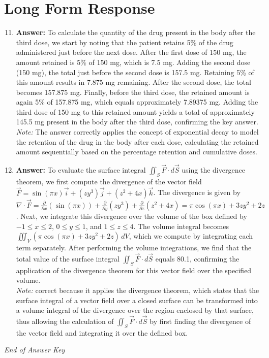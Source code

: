 \documentclass[12pt]{article}
\begin{document}
\section*{Long Form Response}
\begin{enumerate}[label=\arabic*.]
\setcounter{enumi}{10}
\item \textbf{Answer:} To calculate the quantity of the drug present in the body after the third dose, we start by noting that the patient retains 5\% of the drug administered just before the next dose. After the first dose of 150 mg, the amount retained is 5\% of 150 mg, which is 7.5 mg. Adding the second dose (150 mg), the total just before the second dose is 157.5 mg. Retaining 5\% of this amount results in 7.875 mg remaining. After the second dose, the total becomes 157.875 mg. Finally, before the third dose, the retained amount is again 5\% of 157.875 mg, which equals approximately 7.89375 mg. Adding the third dose of 150 mg to this retained amount yields a total of approximately 145.5 mg present in the body after the third dose, confirming the key answer.
\\ \textit{Note:} The answer correctly applies the concept of exponential decay to model the retention of the drug in the body after each dose, calculating the retained amount sequentially based on the percentage retention and cumulative doses.
\item \textbf{Answer:} To evaluate the surface integral $\iint_S \vec{F} \cdot d \vec{S}$ using the divergence theorem, we first compute the divergence of the vector field $\vec{F} = \sin(\pi x) \vec{i} + (z y^3) \vec{j} + (z^2 + 4 x) \vec{k}$. The divergence is given by $\nabla \cdot \vec{F} = \frac{\partial}{\partial x}(\sin(\pi x)) + \frac{\partial}{\partial y}(zy^3) + \frac{\partial}{\partial z}(z^2 + 4 x) = \pi \cos(\pi x) + 3 zy^2 + 2 z$. Next, we integrate this divergence over the volume of the box defined by $-1 \leq x \leq 2$, $0 \leq y \leq 1$, and $1 \leq z \leq 4$. The volume integral becomes $\iiint_V (\pi \cos(\pi x) + 3 zy^2 + 2 z) \, dV$, which we compute by integrating each term separately. After performing the volume integrations, we find that the total value of the surface integral $\iint_S \vec{F} \cdot d\vec{S}$ equals 80.1, confirming the application of the divergence theorem for this vector field over the specified volume.
\\ \textit{Note:} correct because it applies the divergence theorem, which states that the surface integral of a vector field over a closed surface can be transformed into a volume integral of the divergence over the region enclosed by that surface, thus allowing the calculation of $\iint_S \vec{F} \cdot d \vec{S}$ by first finding the divergence of the vector field and integrating it over the defined box.
\end{enumerate}

\vfill
\noindent\textit{End of Answer Key}
\end{document}
